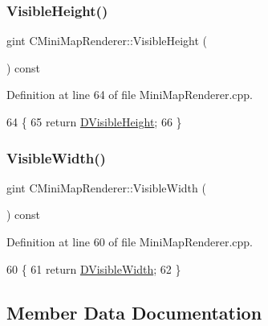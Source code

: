\subsubsection{\texorpdfstring{Visible\+Height()}{VisibleHeight()}}
{\footnotesize\ttfamily gint C\+Mini\+Map\+Renderer\+::\+Visible\+Height (\begin{DoxyParamCaption}{ }\end{DoxyParamCaption}) const}



Definition at line 64 of file Mini\+Map\+Renderer.\+cpp.


\begin{DoxyCode}
64                                           \{
65     \textcolor{keywordflow}{return} \hyperlink{classCMiniMapRenderer_aad56353e51a1a3da66d3428cf0f1ccf8}{DVisibleHeight};
66 \}
\end{DoxyCode}
\hypertarget{classCMiniMapRenderer_ac81d364e25f10efe5fdcd71aee03e60d}{}\label{classCMiniMapRenderer_ac81d364e25f10efe5fdcd71aee03e60d} 
\subsubsection{\texorpdfstring{Visible\+Width()}{VisibleWidth()}}
{\footnotesize\ttfamily gint C\+Mini\+Map\+Renderer\+::\+Visible\+Width (\begin{DoxyParamCaption}{ }\end{DoxyParamCaption}) const}



Definition at line 60 of file Mini\+Map\+Renderer.\+cpp.


\begin{DoxyCode}
60                                          \{
61     \textcolor{keywordflow}{return} \hyperlink{classCMiniMapRenderer_aedcb790a697e6f606cd7fa5089a41359}{DVisibleWidth};
62 \}
\end{DoxyCode}


\subsection{Member Data Documentation}
\hypertarget{classCMiniMapRenderer_a352998f61c6777ccb3969712b8e691d9}{}\label{classCMiniMapRenderer_a352998f61c6777ccb3969712b8e691d9} 
